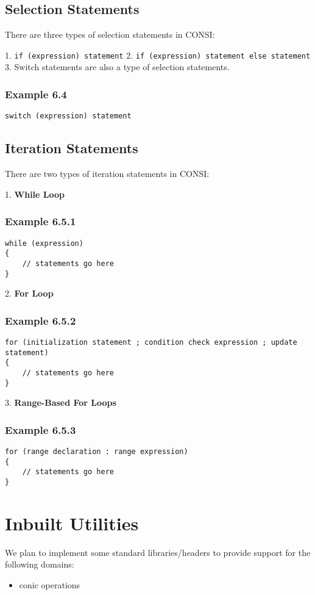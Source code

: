 \documentclass[12pt]{fphw}
\begin{document}
\subsection{Selection Statements}

There are three types of selection statements in CONSI:

1. \texttt{if (expression) statement}
2. \texttt{if (expression) statement else statement}
3. Switch statements are also a type of selection statements.

\subsubsection*{Example 6.4}
\begin{verbatim}
switch (expression) statement
\end{verbatim}

\subsection{Iteration Statements}

There are two types of iteration statements in CONSI:

1. \textbf{While Loop}

\subsubsection*{Example 6.5.1}
\begin{verbatim}
while (expression)
{
    // statements go here
}
\end{verbatim}

2. \textbf{For Loop}

\subsubsection*{Example 6.5.2}
\begin{verbatim}
for (initialization statement ; condition check expression ; update statement)
{
    // statements go here
}
\end{verbatim}

3. \textbf{Range-Based For Loops}

\subsubsection*{Example 6.5.3}
\begin{verbatim}
for (range declaration : range expression)
{
    // statements go here
}
\end{verbatim}

\section{Inbuilt Utilities}
We plan to implement some standard libraries/headers to provide support for the following domains:
\begin{itemize}
    \item conic operations
\end{itemize}
\end{document}
